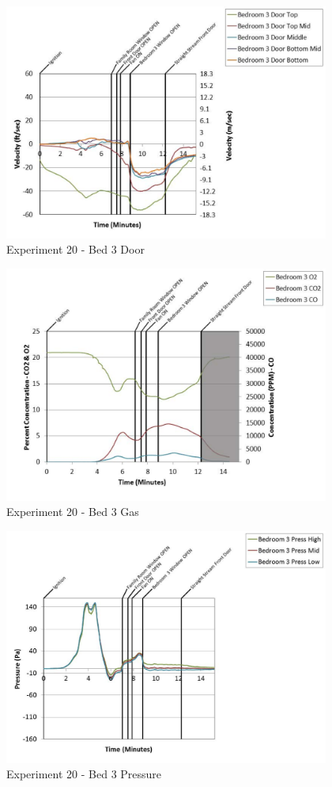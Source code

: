 \documentclass{article}
\begin{document}
\begin{appendices}
	\begin{figure}[h!]
		\centering
		\includegraphics[height=3.05in]{0_Images/Results_Charts/Exp_20_Charts/Bed3Door.pdf}
		\caption{Experiment 20 - Bed 3 Door}
	\end{figure}
 
	\clearpage

	\begin{figure}[h!]
		\centering
		\includegraphics[height=3.05in]{0_Images/Results_Charts/Exp_20_Charts/Bed3Gas.pdf}
		\caption{Experiment 20 - Bed 3 Gas}
	\end{figure}
 

	\begin{figure}[h!]
		\centering
		\includegraphics[height=3.05in]{0_Images/Results_Charts/Exp_20_Charts/Bed3Pressure.pdf}
		\caption{Experiment 20 - Bed 3 Pressure}
	\end{figure}
 

\end{appendices}
\end{document}
